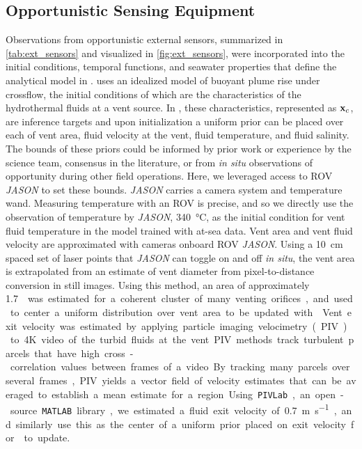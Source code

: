 \subsection{Opportunistic Sensing Equipment}
\label{sec:external_current}
Observations from opportunistic external sensors, summarized in \cref{tab:ext_sensors} and visualized in \cref{fig:ext_sensors}, were incorporated into the initial conditions, temporal functions, and seawater properties that define the analytical model in \PHUMES. \PHUMES uses an idealized model of buoyant plume rise under crossflow, the initial conditions of which are the characteristics of the hydrothermal fluids at a vent source. In \PHUMES, these characteristics, represented as $\mathbf{x}_c$, are inference targets and upon initialization a uniform prior can be placed over each of vent area, fluid velocity at the vent, fluid temperature, and fluid salinity. The bounds of these priors could be informed by prior work or experience by the science team, consensus in the literature, or from \emph{in situ} observations of opportunity during other field operations. Here, we leveraged access to ROV \emph{JASON} to set these bounds. \emph{JASON} carries a camera system and temperature wand. Measuring temperature with an ROV is precise, and so we directly use the observation of temperature by \emph{JASON}, \SI{340}{\celsius}, as the initial condition for vent fluid temperature in the \PHUMES model trained with at-sea data. Vent area and vent fluid velocity are approximated with cameras onboard ROV \emph{JASON}. Using a \SI{10}{\centi\meter} spaced set of laser points that \emph{JASON} can toggle on and off \emph{in situ}, the vent area is extrapolated from an estimate of vent diameter from pixel-to-distance conversion in still images. Using this method, an area of approximately \SI{1.7}{\meter\square} was estimated for a coherent cluster of many venting orifices, and used to center a uniform distribution over vent area to be updated with \PHUMES. Vent exit velocity was estimated by applying particle imaging velocimetry (PIV)\autocite{zhang2019time} to 4K video of the turbid fluids at the vent. PIV methods track turbulent parcels that have high cross-correlation values between frames of a video. By tracking many parcels over several frames, PIV yields a vector field of velocity estimates that can be averaged to establish a mean estimate for a region. Using \verb|PIVLab|, an open-source \verb|MATLAB| library, we estimated a fluid exit velocity of \SI{0.7}{\meter\per\second}, and similarly use this as the center of a uniform prior placed on exit velocity for \PHUMES to update.

